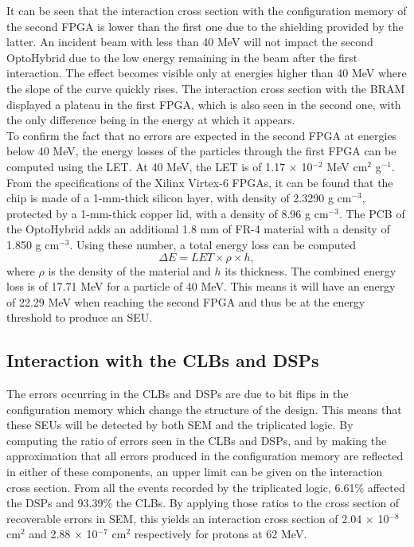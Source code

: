       It can be seen that the interaction cross section with the configuration memory of the second FPGA is lower than the first one due to the shielding provided by the latter. An incident beam with less than 40 MeV will not impact the second OptoHybrid due to the low energy remaining in the beam after the first interaction. The effect becomes visible only at energies higher than 40 MeV where the slope of the curve quickly rises. The interaction cross section with the BRAM displayed a plateau in the first FPGA, which is also seen in the second one, with the only difference being in the energy at which it appears. \\

      To confirm the fact that no errors are expected in the second FPGA at energies below 40 MeV, the energy losses of the particles through the first FPGA can be computed using the LET. At 40 MeV, the LET is of 1.17 $ \times $ 10$^{-2} $ MeV cm$^2$ g$^{-1}$. From the specifications of the Xilinx Virtex-6 FPGAs, it can be found that the chip is made of a 1-mm-thick silicon layer, with density of 2.3290 g cm$^{-3}$, protected by a 1-mm-thick copper lid, with a density of 8.96 g cm$^{-3}$. The PCB of the OptoHybrid adds an additional 1.8 mm of FR-4 material with a density of 1.850 g cm$^{-3}$. Using these number, a total energy loss can be computed
      \begin{equation}
        \Delta E = LET \times \rho \times h,
      \end{equation}
      where $\rho$ is the density of the material and $ h $ its thickness. The combined energy loss is of 17.71 MeV for a particle of 40 MeV. This means it will have an energy of 22.29 MeV when reaching the second FPGA and thus be at the energy threshold to produce an SEU.

    \subsection{Interaction with the CLBs and DSPs}

      The errors occurring in the CLBs and DSPs are due to bit flips in the configuration memory which change the structure of the design. This means that these SEUs will be detected by both SEM and the triplicated logic. By computing the ratio of errors seen in the CLBs and DSPs, and by making the approximation that all errors produced in the configuration memory are reflected in either of these components, an upper limit can be given on the interaction cross section. From all the events recorded by the triplicated logic, 6.61\% affected the DSPs and 93.39\% the CLBs. By applying those ratios to the cross section of recoverable errors in SEM, this yields an interaction cross section of 2.04 $ \times $ 10$^{-8}$ cm$^2$ and 2.88 $ \times $ 10$^{-7}$ cm$^2$ respectively for protons at 62 MeV.

